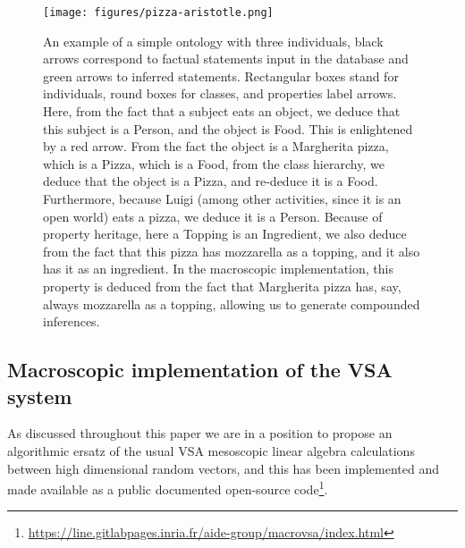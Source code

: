 \documentclass[sn-mathphys]{sn-jnl}
\newcommand{\hhref}[1]{\href{#1}{#1}}
\begin{document}
\begin{figure}[htbp]
\centerline{\texttt{[image: figures/pizza-aristotle.png]}}
\caption{An example of a simple ontology with three individuals, black arrows correspond to factual statements input in the database and green arrows to inferred statements. Rectangular boxes stand for individuals, round boxes for classes, and properties label arrows. Here, from the fact that a subject eats an object, we deduce that this subject is a Person, and the object is Food. This is enlightened by a red arrow. From the fact the object is a Margherita pizza, which is a Pizza, which is a Food, from the class hierarchy, we deduce that the object is a Pizza, and re-deduce it is a Food. Furthermore, because Luigi (among other activities, since it is an open world) eats a pizza, we deduce it is a Person. Because of property heritage, here a Topping is an Ingredient, we also deduce from the fact that this pizza has mozzarella as a topping, and it also has it as an ingredient. In the macroscopic implementation, this property is deduced from the fact that Margherita pizza has, say, always mozzarella as a topping, allowing us to generate compounded inferences.}
\label{Pizza}
\end{figure}

\subsection{Macroscopic implementation of the VSA system}\label{macrovsa}

As discussed throughout this paper we are in a position to propose an algorithmic ersatz of the usual VSA mesoscopic linear algebra calculations between high dimensional random vectors, and this has been implemented and made available as a public documented open-source code\footnote{\hhref{https://line.gitlabpages.inria.fr/aide-group/macrovsa/index.html}}.
\end{document}
